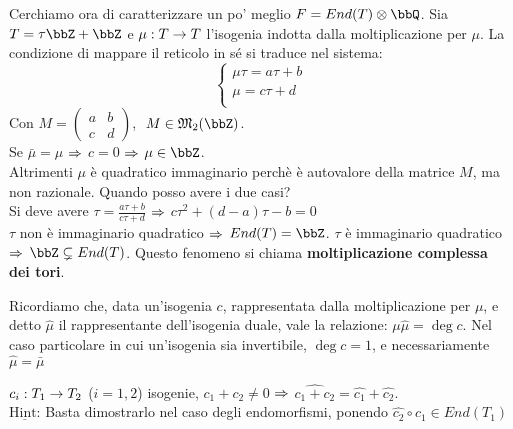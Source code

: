     \noindent Cerchiamo ora di caratterizzare un po' meglio $F=End(T) \otimes \bbQ$. Sia $T=\tau \bbZ + \bbZ$ e $\mu : T \rightarrow T$ l'isogenia indotta dalla moltiplicazione per $\mu$. La condizione di mappare il reticolo in sé si traduce nel sistema:
    \begin{equation*}
    \begin{cases}
    	\mu \tau = a\tau + b\\
    	\mu = c\tau + d\\
    \end{cases}
    \end{equation*}
    Con $M=
    \begin{pmatrix}
    a & b \\
    c & d
    \end{pmatrix}$, $ \ M\in \mathfrak{M}_{2}(\bbZ)$.\\
    Se $\bar{\mu}=\mu$ $\Rightarrow$ $c=0$ $\Rightarrow$ $\mu \in \bbZ$.\\
    Altrimenti $\mu$ è quadratico immaginario perchè è autovalore della matrice $M$, ma non razionale.
    Quando posso avere i due casi?\\
    Si deve avere $\tau = \frac{a\tau + b}{c\tau + d}$ $\Rightarrow$ $c\tau^{2} + (d-a)\tau - b=0$\\
    $\tau$ non è immaginario quadratico $\Rightarrow$ $End(T)=\bbZ$.
    $\tau$ è immaginario quadratico $\Rightarrow$ $\bbZ \subsetneq End(T)$. Questo fenomeno si chiama {\bf moltiplicazione complessa dei tori}.

    Ricordiamo che, data un'isogenia $c$, rappresentata dalla moltiplicazione per $\mu$, e detto $\hat\mu$ il rappresentante dell'isogenia duale, vale la relazione: $\mu \hat\mu = \deg c$. Nel caso particolare in cui un'isogenia sia invertibile, $\deg c = 1$, e necessariamente $\hat\mu = \bar\mu$

     $c_{i}: T_{1} \rightarrow T_{2}$ ($i=1 , 2$) isogenie, $c_{1}+c_{2} \neq 0$ $\Rightarrow$ $\hat{c_{1} + c_{2}}=\hat{c_{1}}+\hat{c_{2}}$.\\
    {\bf $\underline{\mbox{Hint:}}$} Basta dimostrarlo nel caso degli endomorfismi, ponendo $\hat{c_{2}}\circ c_{1} \in End(T_{1})$
